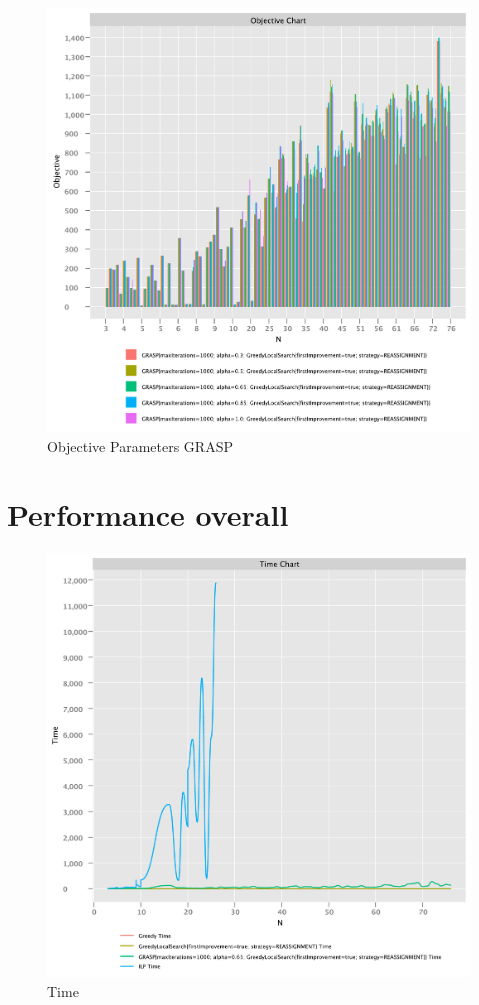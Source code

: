\documentclass{article}
\begin{document}
\begin{figure}
    \centering
    \includegraphics[width=1\textwidth]{./documentation/assets/GRASPParams.objectiveChart.pdf}
    \caption{Objective Parameters GRASP}
    \label{fig:grasp_time}
\end{figure}\FloatBarrier

\newpage

\section{Performance overall}

\begin{figure}[!h]
    \centering
    \includegraphics[width=1\textwidth]{./documentation/assets/all.timeChart.pdf}
    \caption{Time}
    \label{fig:all_time}
\end{figure}\FloatBarrier
\end{document}
